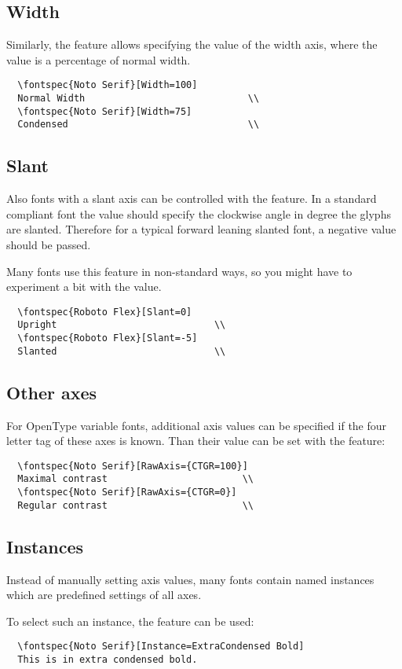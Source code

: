 \documentclass[a4paper]{l3doc}
\begin{document}
\subsection{Width} \label{sec:variable-width}
Similarly, the  feature allows specifying the value of the width axis,
where the value is a percentage of normal width.
\begin{Verbatim}
  \fontspec{Noto Serif}[Width=100]
  Normal Width                             \\
  \fontspec{Noto Serif}[Width=75]
  Condensed                                \\
\end{Verbatim}

\subsection{Slant} \label{sec:variable-slant}
Also fonts with a slant axis can be controlled with the  feature.
In a standard compliant font the value should specify the clockwise angle in degree
the glyphs are slanted. Therefore for a typical forward leaning slanted font, a
negative value should be passed.

Many fonts use this feature in non-standard ways, so you might have to experiment
a bit with the value.
\begin{Verbatim}
  \fontspec{Roboto Flex}[Slant=0]
  Upright                            \\
  \fontspec{Roboto Flex}[Slant=-5]
  Slanted                            \\
\end{Verbatim}

\subsection{Other axes} \label{sec:variable-raw}
For OpenType variable fonts, additional axis values can be specified
if the four letter tag of these axes is known.
Than their value can be set with the  feature:
\begin{Verbatim}
  \fontspec{Noto Serif}[RawAxis={CTGR=100}]
  Maximal contrast                        \\
  \fontspec{Noto Serif}[RawAxis={CTGR=0}]
  Regular contrast                        \\
\end{Verbatim}

\subsection{Instances} \label{sec:variable-instances}
Instead of manually setting axis values, many fonts contain named instances which are predefined settings of all axes.

To select such an instance, the  feature can be used:
\begin{Verbatim}
  \fontspec{Noto Serif}[Instance=ExtraCondensed Bold]
  This is in extra condensed bold.
\end{Verbatim}
\end{document}
